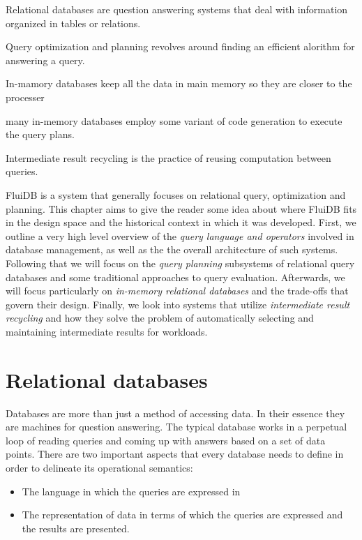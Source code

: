 
\begin{summary}
\item Relational databases are question answering systems that deal
  with information organized in tables or relations.
\item Query optimization and planning revolves around finding an
  efficient alorithm for answering a query.
\item In-mamory databases keep all the data in main memory so they are
  closer to the processer
\item many in-memory databases employ some variant of code generation
  to execute the query plans.
\item Intermediate result recycling is the practice of reusing
  computation between queries.
\end{summary}

FluiDB is a system that generally focuses on relational query,
optimization and planning. This chapter aims to give the reader some
idea about where FluiDB fits in the design space and the historical
context in which it was developed.  First, we outline a very high
level overview of the \emph{query language and operators} involved in
database management, as well as the the overall architecture of such
systems. Following that we will focus on the \emph{query planning}
subsystems of relational query databases and some traditional
approaches to query evaluation. Afterwards, we will focus particularly
on \emph{in-memory relational databases} and the trade-offs that
govern their design. Finally, we look into systems that utilize
\emph{intermediate result recycling} and how they solve the problem of
automatically selecting and maintaining intermediate results for
workloads.

\section{Relational databases}

Databases are more than just a method of accessing data. In their
essence they are machines for question answering. The typical database
works in a perpetual loop of reading queries and coming up with
answers based on a set of data points. There are two important aspects
that every database needs to define in order to delineate its
operational semantics:

\begin{itemize}
\item The language in which the queries are expressed in
\item The representation of data in terms of which the queries are
  expressed and the results are presented.
\end{itemize}

